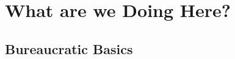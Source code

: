﻿%






\setcounter{section}{-1} %




\section{What are we Doing Here?}

\begin{frame}

\scriptsize{\tableofcontents}

\end{frame}

\subsection{Bureaucratic Basics}




